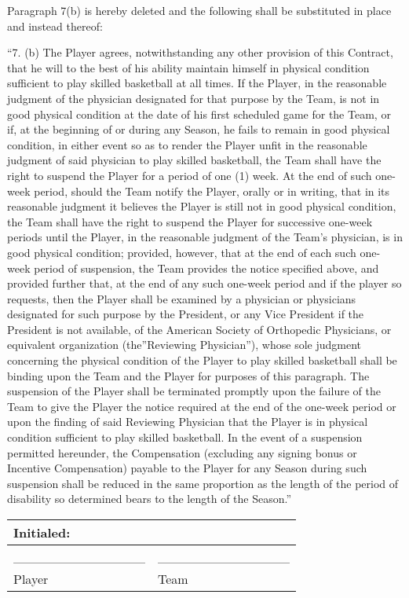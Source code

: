 \documentclass[
]{book}
\begin{document}
Paragraph 7(b) is hereby deleted and the following shall be substituted in place and instead thereof:

``7. (b) The Player agrees, notwithstanding any other provision of this Contract, that he will to the best of his ability maintain himself in physical condition sufficient to play skilled basketball at all times. If the Player, in the reasonable judgment of the physician designated for that purpose by the Team, is not in good physical condition at the date of his first scheduled game for the Team, or if, at the beginning of or during any Season, he fails to remain in good physical condition, in either event so as to render the Player unfit in the reasonable judgment of said physician to play skilled basketball, the Team shall have the right to suspend the Player for a period of one (1) week. At the end of such one-week period, should the Team notify the Player, orally or in writing, that in its reasonable judgment it believes the Player is still not in good physical condition, the Team shall have the right to suspend the Player for successive one-week periods until the Player, in the reasonable judgment of the Team's physician, is in good physical condition; provided, however, that at the end of each such one-week period of suspension, the Team provides the notice specified above, and provided further that, at the end of any such one-week period and if the player so requests, then the Player shall be examined by a physician or physicians designated for such purpose by the President, or any Vice President if the President is not available, of the American Society of Orthopedic Physicians, or equivalent organization (the''Reviewing Physician''), whose sole judgment concerning the physical condition of the Player to play skilled basketball shall be binding upon the Team and the Player for purposes of this paragraph. The suspension of the Player shall be terminated promptly upon the failure of the Team to give the Player the notice required at the end of the one-week period or upon the finding of said Reviewing Physician that the Player is in physical condition sufficient to play skilled basketball. In the event of a suspension permitted hereunder, the Compensation (excluding any signing bonus or Incentive Compensation) payable to the Player for any Season during such suspension shall be reduced in the same proportion as the length of the period of disability so determined bears to the length of the Season.''

\begin{longtable}[]{@{}ll@{}}
\toprule()
Initialed: & \\
\midrule()
\endhead
\_\_\_\_\_\_\_\_\_\_\_\_\_\_ & \_\_\_\_\_\_\_\_\_\_\_\_\_\_ \\
Player & Team \\
\bottomrule()
\end{longtable}
\end{document}
